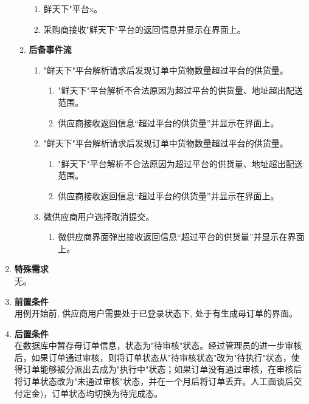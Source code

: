 \begin{enumerate}
\begin{enumerate}
\begin{enumerate}
            \item 鲜天下"平台x。

            \item 采购商接收"鲜天下"平台的返回信息并显示在界面上。

        \end{enumerate}
        \item \textbf{后备事件流}
        \begin{enumerate}
            \item "鲜天下"平台解析请求后发现订单中货物数量超过平台的供货量。
            \begin{enumerate}
                \item "鲜天下"平台解析不合法原因为超过平台的供货量、地址超出配送范围。
                \item 供应商接收返回信息“超过平台的供货量”并显示在界面上。
            \end{enumerate}

            \item "鲜天下"平台解析请求后发现订单中货物数量超过平台的供货量。
            \begin{enumerate}
                \item "鲜天下"平台解析不合法原因为超过平台的供货量、地址超出配送范围。
                \item 供应商接收返回信息“超过平台的供货量”并显示在界面上。
            \end{enumerate}

            \item 微供应商用户选择取消提交。
            \begin{enumerate}
                \item 微供应商界面弹出接收返回信息“超过平台的供货量”并显示在界面上。
            \end{enumerate}

        \end{enumerate}
    \end{enumerate}
    \item \textbf{特殊需求} \\ 无。
    \item \textbf{前置条件} \\ 用例开始前, 供应商用户需要处于已登录状态下, 处于有生成母订单的界面。
    \item \textbf{后置条件} \\ 在数据库中暂存母订单信息，状态为"待审核"状态。经过管理员的进一步审核后，如果订单通过审核，则将订单状态从"待审核状态"改为"待执行"状态，使得订单能够被分派出去成为"执行中"状态；如果订单没有通过审核，在审核后将订单状态改为"未通过审核"状态，并在一个月后将订单丢弃。人工面谈后交付定金)，订单状态均切换为待完成态。
\end{enumerate}



